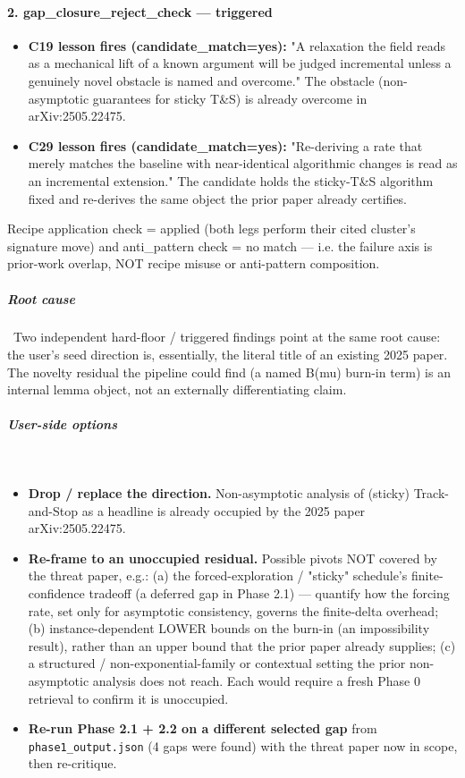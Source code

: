 \paragraph{2. gap\_closure\_reject\_check --- triggered}
\begin{itemize}[leftmargin=*]
\item \textbf{C19 lesson fires (candidate\_match=yes):} "A relaxation the field reads as a mechanical lift of a known argument will be judged incremental unless a genuinely novel obstacle is named and overcome." The obstacle (non-asymptotic guarantees for sticky T\&S) is already overcome in arXiv:2505.22475.
\item \textbf{C29 lesson fires (candidate\_match=yes):} "Re-deriving a rate that merely matches the baseline with near-identical algorithmic changes is read as an incremental extension." The candidate holds the sticky-T\&S algorithm fixed and re-derives the same object the prior paper already certifies.
\end{itemize}

Recipe application check = applied (both legs perform their cited cluster's signature move) and anti\_pattern check = no match --- i.e. the failure axis is prior-work overlap, NOT recipe misuse or anti-pattern composition.

\subparagraph{\textbf{Root cause}}\
Two independent hard-floor / triggered findings point at the same root cause: the user's seed direction is, essentially, the literal title of an existing 2025 paper. The novelty residual the pipeline could find (a named B(mu) burn-in term) is an internal lemma object, not an externally differentiating claim.

\subparagraph{\textbf{User-side options}}\
\begin{itemize}[leftmargin=*]
\item \textbf{Drop / replace the direction.} Non-asymptotic analysis of (sticky) Track-and-Stop as a headline is already occupied by the 2025 paper arXiv:2505.22475.
\item \textbf{Re-frame to an unoccupied residual.} Possible pivots NOT covered by the threat paper, e.g.: (a) the forced-exploration / "sticky" schedule's finite-confidence tradeoff (a deferred gap in Phase 2.1) --- quantify how the forcing rate, set only for asymptotic consistency, governs the finite-delta overhead; (b) instance-dependent LOWER bounds on the burn-in (an impossibility result), rather than an upper bound that the prior paper already supplies; (c) a structured / non-exponential-family or contextual setting the prior non-asymptotic analysis does not reach. Each would require a fresh Phase 0 retrieval to confirm it is unoccupied.
\item \textbf{Re-run Phase 2.1 + 2.2 on a different selected gap} from \texttt{phase1\_output.json} (4 gaps were found) with the threat paper now in scope, then re-critique.
\end{itemize}

